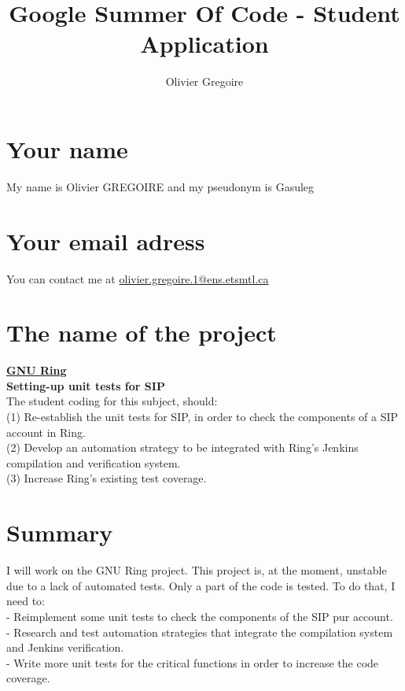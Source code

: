 \documentclass{article}
\title{Google Summer Of Code - Student Application}
\author{Olivier Gregoire}
\begin{document}
\maketitle

\section{Your name}
My name is Olivier GREGOIRE and my pseudonym is Gasuleg

\section{Your email adress}
You can contact me at
\href{mailto:olivier.gregoire.1@ens.etsmtl.ca}{olivier.gregoire.1@ens.etsmtl.ca}


\section{The name of the project}

\underline{\textbf{GNU Ring}} \\
\textbf{Setting-up unit tests for SIP} \\
The student coding for this subject, should: \\
(1) Re-establish the unit tests for SIP, in order to check the components of a SIP account in Ring.\\
(2) Develop an automation strategy to be integrated with Ring's Jenkins compilation and verification system. \\
(3) Increase Ring's existing test coverage. \\

\section{Summary}
I will work on the GNU Ring project. This project is, at the moment, unstable due to a lack of automated tests. Only a part of the code is tested. To do that, I need to: \\
  - Reimplement some unit tests to check the components of the SIP pur account. \\
  - Research and test automation strategies that integrate the compilation system and Jenkins verification. \\
  - Write more unit tests for the critical functions in order to increase the code coverage.\\
\end{document}
